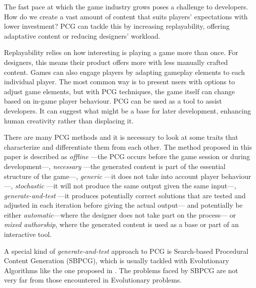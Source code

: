 \documentclass[runningheads,a4paper]{llncs}
\begin{document}
The fast pace at which the game industry grows poses a challenge to developers. 
How do we create a vast amount of content that suits 
players' expectations with lower investment? PCG can tackle this by  
increasing replayability, offering adaptative content or reducing designers' 
workload.\cite{togelius2016introduction}

Replayability relies on how interesting is 
playing a game more than once. For designers, this means their 
product offers more with less manually crafted content. 
Games can also engage players by adapting gameplay elements to each individual 
player. The most common way is 
to present users with options to adjust game elements, but with PCG techniques, 
the game itself can change based on in-game player behaviour.
PCG can be used as a tool to assist developers. It can suggest what might be a 
base for later development, enhancing human creativity rather than displacing 
it.

There are many PCG methods and it is necessary to look at some traits that 
characterize and differentiate them from each 
other\cite{togelius2016introduction}. The method proposed in this paper is 
described as \textit{offline} ---the PCG occurs before the game session or 
during development---, \textit{necessary} ---the generated content is part of 
the essential structure of the game---, \textit{generic} ---it does not take 
into account player behaviour---, \textit{stochastic} ---it will not produce 
the same output given the same input---, \textit{generate-and-test} ---it 
produces potentially correct solutions that are tested and adjusted in each 
iteration before giving the actual output--- and potentially be either 
\textit{automatic}---where the designer does not take part on the process--- or 
\textit{mixed authorship}, where the generated content is used as a base or 
part of an interactive tool. 

A special kind of \textit{generate-and-test} approach to PCG is
Search-based Procedural Content Generation (SBPCG), which is
usually tackled with Evolutionary Algorithms\cite{togelius2010search} like the 
one proposed in \cite{hastings2009evolving}. 
The problems faced by SBPCG are not very far from those encountered in Evolutionary problems.  
\end{document}
